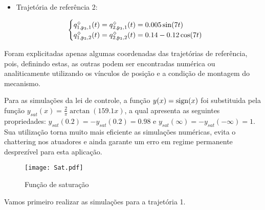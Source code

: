 \begin{itemize}
\item Trajet\'oria de refer\^encia 2:

$$ \begin{cases}
q_{1,\mathtt{p}_3,1}^{\scriptscriptstyle \diamondsuit}(t) = q_{2,\mathtt{p}_3,1}^{\scriptscriptstyle \diamondsuit}(t) = 0.005 \sin(7t) \\
q_{1,\mathtt{p}_3,2}^{\scriptscriptstyle \diamondsuit}(t) = q_{2,\mathtt{p}_3,2}^{\scriptscriptstyle \diamondsuit}(t) = 0.14 - 0.12 \cos(7t) \\
\end{cases}$$

\end{itemize}

Foram explicitadas apenas algumas coordenadas das trajet\'orias de refer\^encia, pois, definindo estas, as outras podem ser encontradas num\'erica ou analiticamente utilizando os v\'inculos de posi\c{c}\~ao e a condi\c{c}\~ao de montagem do mecanismo.

Para as simula\c{c}\~oes da lei de controle, a fun\c{c}\~ao $y(x) = \operatorname*{sign}(x)$ foi substituida pela fun\c{c}\~ao $y_{sat}(x) = \frac{2}{\pi}\arctan(159.1 x)$, a qual apresenta as seguintes propriedades: $y_{sat}(0.2) = -y_{sat}(0.2) = 0.98$ e $y_{sat}(\infty) = - y_{sat}(-\infty) = 1$. Sua utiliza\c{c}\~ao torna muito mais eficiente as simula\c{c}\~oes num\'ericas, evita o chattering nos atuadores e ainda garante um erro em regime permanente desprez\'ivel para esta aplica\c{c}\~ao.

\begin{figure}[H]
	\centering
	\texttt{[image: Sat.pdf]}
	\caption{Fun\c{c}\~ao de satura\c{c}\~ao}
	\label{Sat}
\end{figure}

Vamos primeiro realizar as simula\c{c}\~oes para a trajet\'oria 1. 




